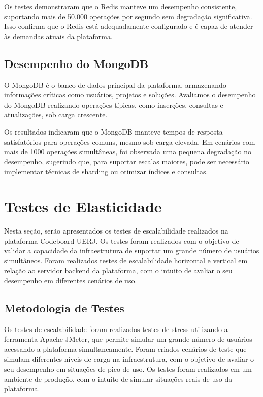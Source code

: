 Os testes demonstraram que o Redis manteve um desempenho consistente, suportando mais de 50.000 operações por segundo sem degradação significativa. Isso confirma que o Redis está adequadamente configurado e é capaz de atender às demandas atuais da plataforma.

\subsection{Desempenho do MongoDB}

O MongoDB é o banco de dados principal da plataforma, armazenando informações críticas como usuários, projetos e soluções. Avaliamos o desempenho do MongoDB realizando operações típicas, como inserções, consultas e atualizações, sob carga crescente.

Os resultados indicaram que o MongoDB manteve tempos de resposta satisfatórios para operações comuns, mesmo sob carga elevada. Em cenários com mais de 1000 operações simultâneas, foi observada uma pequena degradação no desempenho, sugerindo que, para suportar escalas maiores, pode ser necessário implementar técnicas de sharding ou otimizar índices e consultas.

\section{Testes de Elasticidade}

Nesta seção, serão apresentados os testes de escalabilidade realizados na plataforma Codeboard UERJ. Os testes foram realizados com o objetivo de validar a capacidade da infraestrutura de suportar um grande número de usuários simultâneos. Foram realizados testes de escalabilidade horizontal e vertical em relação ao servidor backend da plataforma, com o intuito de avaliar o seu desempenho em diferentes cenários de uso.

\subsection{Metodologia de Testes}

Os testes de escalabilidade foram realizados testes de stress utilizando a ferramenta Apache JMeter, que permite simular um grande número de usuários acessando a plataforma simultaneamente. Foram criados cenários de teste que simulam diferentes níveis de carga na infraestrutura, com o objetivo de avaliar o seu desempenho em situações de pico de uso. Os testes foram realizados em um ambiente de produção, com o intuito de simular situações reais de uso da plataforma.

